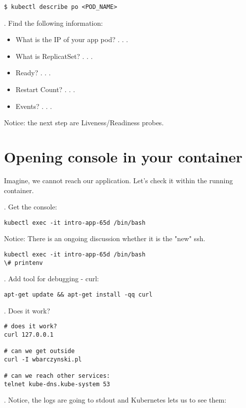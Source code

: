 \documentclass[12pt, letterpaper]{article}
\begin{document}
\begin{verbatim}
$ kubectl describe po <POD_NAME>
\end{verbatim}

. Find the following information:
\begin{itemize}
    \item What is the IP of your app pod? . . .
    \item What is ReplicatSet? . . .
    \item Ready? . . .
    \item Restart Count? . . .
    \item Events? . . .
\end{itemize}

Notice: the next step are Liveness/Readiness probes.

%
%
%
\pagebreak
\section{Opening console in your container}

Imagine, we cannot reach our application. Let's check it within the running container.

. Get the console:

\begin{verbatim}
kubectl exec -it intro-app-65d /bin/bash
\end{verbatim}

Notice: There is an ongoing discussion whether it is the "new" ssh.

\begin{verbatim}
kubectl exec -it intro-app-65d /bin/bash
\# printenv
\end{verbatim}

. Add tool for debugging - curl:

\begin{verbatim}
apt-get update && apt-get install -qq curl
\end{verbatim}

. Does it work?

\begin{verbatim}
# does it work?
curl 127.0.0.1

# can we get outside
curl -I wbarczynski.pl

# can we reach other services:
telnet kube-dns.kube-system 53
\end{verbatim}

. Notice, the logs are going to stdout and Kubernetes lets us to see them:
\end{document}
